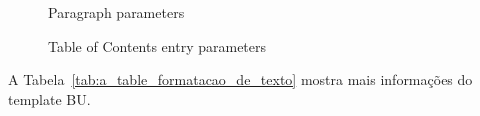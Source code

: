 \begin{figure}
    \caption{Paragraph parameters}\label{fig:fpara}
\end{figure}


\begin{figure}
    \caption{Table of Contents entry parameters}\label{fig:tocp}
\end{figure}




A Tabela~\ref{tab:a_table_formatacao_de_texto} mostra mais informações do template BU.

%
%
%
%
%
%
\setlength\extrarowheight{2pt}
